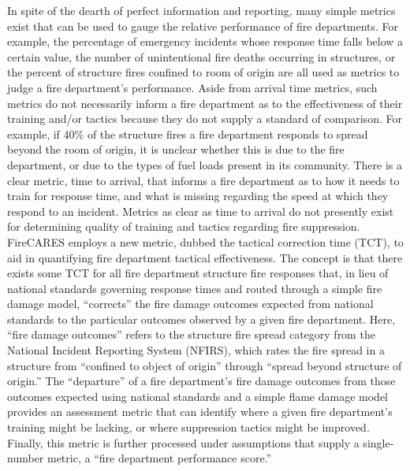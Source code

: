 \documentclass[12pt,oneside]{book}
\begin{document}
In spite of the dearth of perfect information and reporting, many simple metrics exist that can be used to gauge the relative performance of fire departments. For example, the percentage of emergency incidents whose response time falls below a certain value, the number of unintentional fire deaths occurring in structures, or the percent of structure fires confined to room of origin are all used as metrics to judge a fire department's performance. Aside from arrival time metrics, such metrics do not necessarily inform a fire department as to the effectiveness of their training and/or tactics because they do not supply a standard of comparison. For example, if 40\% of the structure fires a fire department responds to spread beyond the room of origin, it is unclear whether this is due to the fire department, or due to the types of fuel loads present in its community. There is a clear metric, time to arrival, that informs a fire department as to how it needs to train for response time, and what is missing regarding the speed at which they respond to an incident. Metrics as clear as time to arrival do not presently exist for determining quality of training and tactics regarding fire suppression. FireCARES employs a new metric, dubbed the tactical correction time (TCT), to aid in quantifying fire department tactical effectiveness. The concept is that there exists some TCT for all fire department structure fire responses that, in lieu of national standards governing response times and routed through a simple fire damage model, ``corrects'' the fire damage outcomes expected from national standards to the particular outcomes observed by a given fire department.  Here, ``fire damage outcomes'' refers to the structure fire spread category from the National Incident Reporting System (NFIRS), which rates the fire spread in a structure from ``confined to object of origin'' through ``spread beyond structure of origin.'' The ``departure'' of a fire department's fire damage outcomes from those outcomes expected using national standards and a simple flame damage model provides an assessment metric that can identify where a given fire department's training might be lacking, or where suppression tactics might be improved. Finally, this metric is further processed under assumptions that supply a single-number metric, a ``fire department performance score.''
\end{document}
